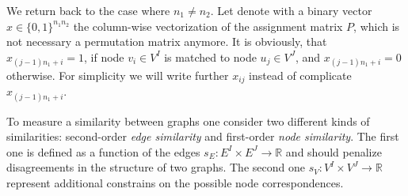 We return back to the case where $n_1\not=n_2$. Let denote with a binary vector $x\in \{0,1\}^{n_1n_2}$ the column-wise vectorization of the assignment matrix $P$, which is not necessary a permutation matrix anymore. It is obviously, that $x_{(j-1)n_1+i}=1$, if node $v_i\in V^I$ is matched to node $u_j\in V^J$, and $x_{(j-1)n_1+i}=0$ otherwise. For simplicity we will write further $x_{ij}$ instead of complicate $x_{(j-1)n_1+i}$.
 


To measure a similarity between graphs one consider two different kinds of similarities: second-order \emph{edge similarity} and first-order \emph{node similarity}. The first one is defined as a function of the edges $s_E:E^I\times E^J\rightarrow\mathbb{R}$ and should penalize disagreements in the structure of two graphs. The second one $s_V:V^I\times V^J\rightarrow\mathbb{R}$ represent additional constrains on the possible node correspondences.


